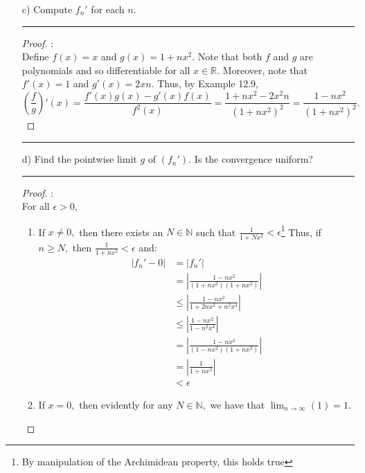 \documentclass[openany, amssymb, psamsfonts]{amsart}
\newcommand{\bbN}{\mathbb{N}}
\newcommand{\bbR}{\mathbb{R}}
\theoremstyle{definition}
\numberwithin{equation}{section}
\begin{document}
\begin{enumerate}
\begin{enumerate}
\begin{proof}
\begin{align*}
    &<\epsilon.
\end{align*}
While one could reach the fact that $2\sqrt{N}$ is the magical bounds for any epsilon tube around $f = 0$ by a longer route using differentiation, but as stated, graphing is sufficient.
\end{proof}\vspace{4pt}    \hrule   \vspace{4pt}
\item[c)] Compute $f_n'$ for each $n$.
\vspace{4pt}    \hrule   \vspace{4pt}\begin{proof}:\\
Define $f(x)= x$ and $g(x) = 1+nx^2.$ Note that both $f$ and $g$ are polynomials and so differentiable for all $x\in \bbR.$ Moreover, note that $f'(x)= 1$ and $g'(x) = 2xn.$ Thus, by Example 12.9, \[(\frac{f}{g})'(x) = \frac{f'(x)g(x) - g'(x)f(x)}{f^2(x)} = \frac{1+nx^2 - 2x^2n}{(1+nx^2)^2} = \frac{1-nx^2}{(1+nx^2)^2}.\]
\end{proof}\vspace{4pt}    \hrule   \vspace{4pt}
\item[d)]  Find the pointwise limit $g$ of $(f_n')$. Is the convergence uniform?
\vspace{4pt}    \hrule   \vspace{4pt}\begin{proof}:\\
    For all $\epsilon>0,$ 
    \begin{enumerate}
        \item If $x \neq 0,$ then there exists an $N\in \bbN$ such that $\frac{1}{1+Nx^2}<\epsilon$\footnote{By manipulation of the Archimidean property, this holds true} Thus, if $n\geq N,$ then $\frac{1}{1+nx^2}< \epsilon$ and:
        \begin{align*}
            |f_n' - 0| &= |f_n'|\\
            &= |\frac{1-nx^2}{(1+nx^2)(1+nx^2)}|\\
            &\leq |\frac{1-nx^2}{1+2nx^2+n^2x^4}| \\
            &\leq |\frac{1-nx^2}{1-n^2x^4}|\\
            &= |\frac{1-nx^2}{(1-nx^2)(1+nx^2)}|\\
            &= |\frac{1}{1+nx^2}|\\
            &< \epsilon
        \end{align*}
        \item If $x = 0,$ then evidently for any $N\in \bbN,$ we have that $\displaystyle\lim_{n\to \infty}(1) = 1.$

\end{enumerate}
\end{proof}
\end{enumerate}
\end{enumerate}
\end{document}
